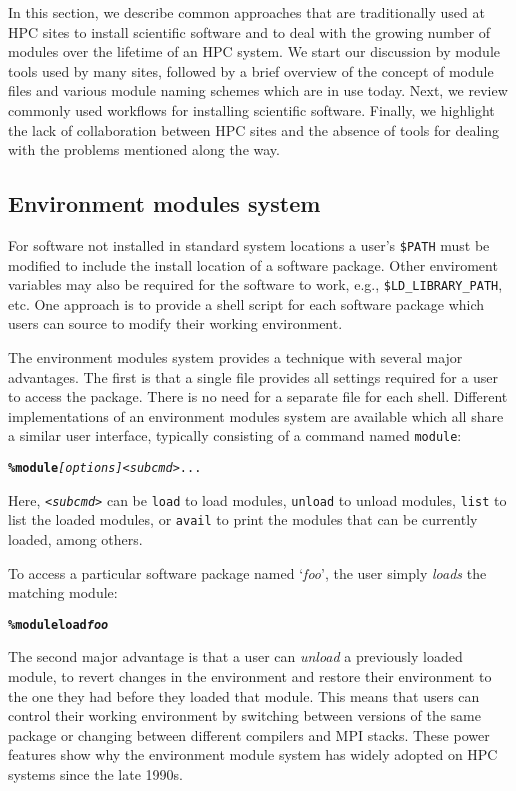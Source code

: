 In this section, we describe common approaches that are traditionally
used at HPC sites to install scientific software and to deal with the
growing number of modules over the lifetime of an HPC system. We start
our discussion by module tools used by many sites, followed by a brief
overview of the concept of module files and various module naming
schemes which are in use today.  Next, we review commonly used
workflows for installing scientific software. Finally,
we highlight the lack of collaboration between HPC sites and the absence
of tools for dealing with the problems mentioned along the way.

\subsection{Environment modules system}
\label{sec:env_modules_system}

For software not installed in standard system locations a user's
\texttt{\small\$PATH} must be modified to include the install location of a
software package.  Other enviroment variables may also be required for the
software to work, e.g., \texttt{\small\$LD\_LIBRARY\_PATH}, etc.
One approach is to provide a shell script for each software package which
users can source to modify their working environment.

The environment modules system provides a technique with several major
advantages. The first is that a single file provides all settings
required for a user to access the package.  There is no need for a
separate file for each shell. Different implementations of an
environment modules system are available which all share a similar
user interface, typically consisting of a command named \texttt{\small module}:
{\small
\begin{alltt}
    \textbf{\% module} \emph{[options]} \emph{<subcmd>} ...
\end{alltt}
}
\noindent
Here, \emph{\texttt{\small<subcmd>}} can be \texttt{\small load} to load modules,
\texttt{\small unload} to unload modules, \texttt{\small list} to list the loaded
modules, or \texttt{\small avail} to print the modules that can be currently
loaded, among others.

To access a particular software package named `\emph{foo}', the user simply
\emph{loads} the matching module:
{\small
\begin{alltt}
    \textbf{\% module load \emph{foo}}
\end{alltt}
}
\noindent
The second major advantage is that a user can \emph{unload} a previously
loaded module, to revert changes in the environment and restore their
environment to the one they had before they loaded that module.  This means
that users can control their working environment by switching between
versions of the same package or changing between different compilers and
MPI stacks.  These power features show why the environment module
system has widely adopted on HPC systems since the late 1990s.


